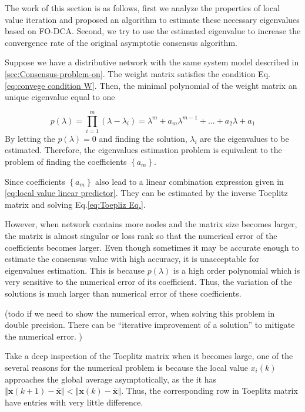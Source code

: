 The work of this section is as follows, first we analyze the properties
of local value iteration and proposed an algorithm to estimate these
necessary eigenvalues based on FO-DCA. Second, we try to use the estimated
eigenvalue to increase the convergence rate of the original asymptotic
consensus algorithm. 

Suppose we have a distributive network with the same system model
described in \ref{sec:Consensus-problem-on}. The weight matrix satisfies
the condition Eq.\ref{eq:convege condition W}. Then, the minimal
polynomial of the weight matrix an unique eigenvalue equal to one 

\[
p(\lambda)=\prod_{i=1}^{m}\left(\lambda-\lambda_{i}\right)=\lambda^{m}+a_{m}\lambda^{m-1}+\ldots+a_{2}\lambda+a_{1}
\]
By letting the $p(\lambda)=0$ and finding the solution, $\lambda_{i}$
are the eigenvalues to be estimated. Therefore, the eigenvalues estimation
problem is equivalent to the problem of finding the coefficients $\left\{ a_{m}\right\} $. 

Since coefficients $\left\{ a_{m}\right\} $ also lead to a linear
combination expression given in \ref{eq:local value linear predictor}.
They can be estimated by the inverse Toeplitz matrix and solving Eq.\ref{eq:Toepliz Eq.}. 

However, when network contains more nodes and the matrix size becomes
larger, the matrix is almost singular or loss rank so that the numerical
error of the coefficients becomes larger. Even though sometimes it
may be accurate enough to estimate the consensus value with high accuracy,
it is unacceptable for eigenvalues estimation. This is because $p(\lambda)$
is a high order polynomial which is very sensitive to the numerical
error of its coefficient. Thus, the variation of the solutions is
much larger than numerical error of these coefficients. 

(todo if we need to show the numerical error, when solving this problem
in double precision. There can be ``iterative improvement of a solution''
to mitigate the numerical error. )

Take a deep inspection of the Toeplitz matrix when it becomes large,
one of the several reasons for the numerical problem is because the
local value $x_{i}\left(k\right)$ approaches the global average asymptotically,
as the it has $\left\Vert \mathbf{x}\left(k+1\right)-\mathbf{\bar{x}}\right\Vert <\left\Vert \mathbf{x}\left(k\right)-\mathbf{\bar{x}}\right\Vert $.
Thus, the corresponding row in Toeplitz matrix have entries with very
little difference.  


